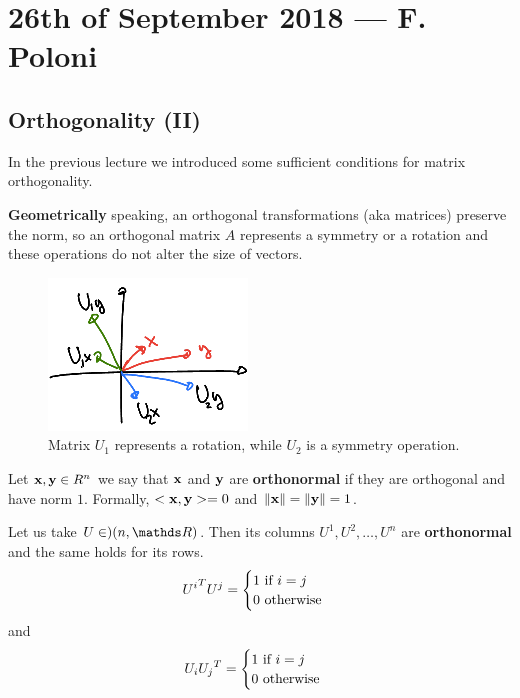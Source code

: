 \documentclass[computationalMathematics.tex]{subfiles}
\begin{document}
\chapter{26th of September 2018 --- F. Poloni}

\section{Orthogonality (II)}
In the previous lecture we introduced some sufficient conditions for matrix orthogonality.

\textbf{Geometrically} speaking, an orthogonal transformations (aka matrices) preserve the norm, so an orthogonal matrix $A$ represents a symmetry or a rotation and these operations do not alter the size of vectors.

\begin{figure}[H]
    \centering
    \includegraphics[scale = 2]{pics/26sett/orthgonal.png}
    \caption{Matrix $U_1$ represents a rotation, while $U_2$ is a symmetry operation.}\label{fig:26sett_ortho}
\end{figure}

\begin{definition}[Orthonormality]
  Let ${\bf x }, {\bf y } \in R^n$ we say that ${\bf x }$ and ${\bf y }$ are \textbf{orthonormal} if they are orthogonal and have norm $1$.
  Formally, $<{\bf x }, {\bf y }> = 0$ and $\left\lVert{\bf x }\right\rVert = \left\lVert{\bf y }\right\rVert = 1$.
\end{definition}

\begin{proposition}
  Let us take $U \in )(n, \R)$.
  Then its columns $U^1, U^2, \ldots, U^n$ are \textbf{orthonormal} and the same holds for its rows.
  \[
  {U^i}^{T} U^j = \begin{cases}
    1 \text{ if } i=j\\
    0 \text{ otherwise}
  \end{cases}
  \]
  and
  \[
    U_i {U_j}^{T} = \begin{cases}
    1 \text{ if } i=j\\
    0 \text{ otherwise}
  \end{cases}
  \]
\end{proposition}
\end{document}
